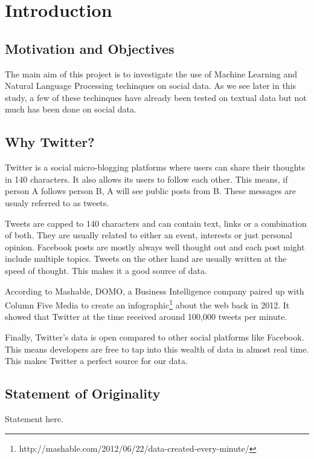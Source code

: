 
\chapter{Introduction}


\section{Motivation and Objectives}
The main aim of this project is to investigate the use of Machine Learning and Natural Language
Processing techinques on social data. As we see later in this study, a few of these techinques have
already been tested on textual data but not much has been done on social data.

\section{Why Twitter?}
Twitter is a social micro-blogging platforms where users can share their thoughts in 140 characters.
It also allows its users to follow each other. This means, if person A follows person B, A will see
public posts from B. These messages are usualy referred to as tweets.

Tweets are capped to 140 characters and can contain text, links or a combination of both. They are
usually related to either an event, interests or just personal opinion. Facebook posts are mostly
always well thought out and each post might include multiple topics. Tweets on the other hand are
usually written at the speed of thought. This makes it a good source of data.

According to Mashable, DOMO, a Business Intelligence company paired up with Column Five Media to
create an infographic\footnote{http://mashable.com/2012/06/22/data-created-every-minute/} about the
web back in 2012. It showed that Twitter at the time received around 100,000 tweets per minute.

Finally, Twitter's data is open compared to other social platforms like Facebook. This means
developers are free to tap into this wealth of data in almost real time. This makes Twitter a
perfect source for our data.


\section{Statement of Originality}

Statement here.

